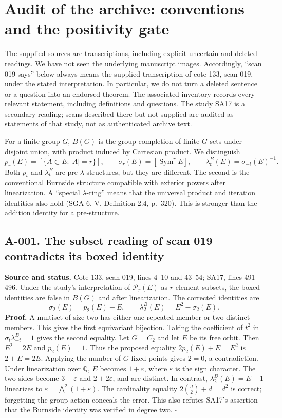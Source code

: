 \section{Audit of the archive: conventions and the positivity gate}
The supplied sources are transcriptions, including explicit uncertain and deleted
readings.  We have not seen the underlying manuscript images.  Accordingly,
``scan 019 says'' below always means the supplied transcription of cote 133,
scan 019, under the stated interpretation.  In particular, we do not turn a
deleted sentence or a question into an endorsed theorem.  The associated
inventory records every relevant statement, including definitions and questions.
The study SA17 is a secondary reading; scans described there but not supplied
are audited as statements of that study, not as authenticated archive text.

For a finite group $G$, $B(G)$ is the group completion of finite $G$-sets under
disjoint union, with product induced by Cartesian product.  We distinguish
\[
 p_r(E)=[\{A\subset E:|A|=r\}],\qquad
 \sigma_r(E)=[\operatorname{Sym}^rE],\qquad
 \lambda_t^B(E)=\sigma_{-t}(E)^{-1}.
\]
Both $p_t$ and $\lambda_t^B$ are pre-$\lambda$ structures, but they are different.
The second is the conventional Burnside structure compatible with exterior
powers after linearization.  A ``special $\lambda$-ring'' means that the
universal product and iteration identities also hold (SGA 6, V, Definition
2.4, p.~320).  This is stronger than the addition identity for a pre-structure.

\subsection*{A-001. The subset reading of scan 019 contradicts its boxed identity}
\textbf{Source and status.} Cote 133, scan 019, lines 4--10 and 43--54;
SA17, lines 491--496.  Under the study's interpretation of $\mathcal P_r(E)$
as $r$-element subsets, the boxed identities are false in $B(G)$ and after
linearization.  The corrected identities are
\[
 \sigma_2(E)=p_2(E)+E,\qquad
 \lambda_2^B(E)=E^2-\sigma_2(E).
\]
\textbf{Proof.} A multiset of size two has either one repeated member or two
distinct members.  This gives the first equivariant bijection.  Taking the
coefficient of $t^2$ in $\sigma_t\lambda^B_{-t}=1$ gives the second equality.
Let $G=C_2$ and let $E$ be its free orbit.  Then $E^2=2E$ and $p_2(E)=1$.
Thus the proposed equality $2p_2(E)+E=E^2$ is $2+E=2E$.  Applying the number
of $G$-fixed points gives $2=0$, a contradiction.  Under linearization over
$\mathbb Q$, $E$ becomes $1+\varepsilon$, where $\varepsilon$ is the sign
character.  The two sides become $3+\varepsilon$ and $2+2\varepsilon$,
and are distinct.  In contrast, $\lambda_2^B(E)=E-1$ linearizes to
$\varepsilon=\bigwedge^2(1+\varepsilon)$.
The cardinality equality $2\binom d2+d=d^2$ is correct; forgetting the group
action conceals the error.  This also refutes SA17's assertion that the
Burnside identity was verified in degree two. \hfill$\square$

